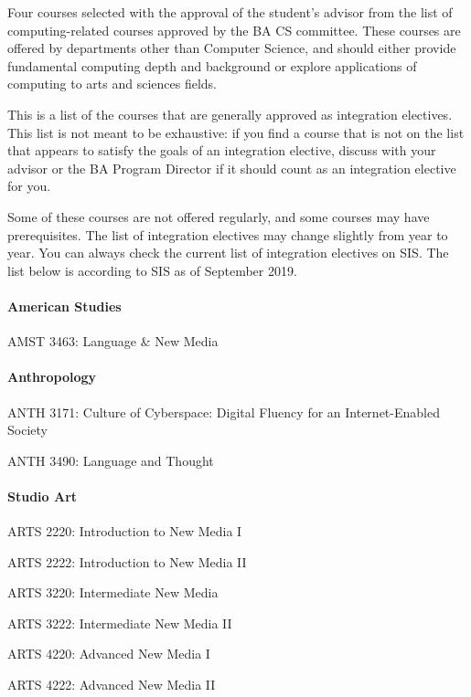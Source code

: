 Four courses selected with the approval of the student's advisor from
the list of computing-related courses approved by the BA CS
committee. These courses are offered by departments other than
Computer Science, and should either provide fundamental computing
depth and background or explore applications of computing to arts and
sciences fields. 

This is a list of the courses that are generally approved as
integration electives. This list is not meant to be exhaustive: if you
find a course that is not on the list that appears to satisfy the
goals of an integration elective, discuss with your advisor or the BA
Program Director if it should count as an integration elective for
you.

Some of these courses are not offered regularly, and some courses may
have prerequisites. The list of integration electives may change
slightly from year to year.  You can always check the current list of
integration electives on SIS.  The list below is according to SIS as
of September 2019.

\paragraph{American Studies}
\begin{itemlist}
\item AMST 3463: Language \& New Media
\end{itemlist}

\paragraph{Anthropology}
\begin{itemlist}
\item ANTH 3171: Culture of Cyberspace: Digital Fluency for an Internet-Enabled Society
\item ANTH 3490: Language and Thought
\end{itemlist}


\paragraph{Studio Art}
\begin{itemlist}
\item ARTS 2220: Introduction to New Media I
\item ARTS 2222: Introduction to New Media II
\item ARTS 3220: Intermediate New Media 
\item ARTS 3222: Intermediate New Media II
\item ARTS 4220: Advanced New Media I
\item ARTS 4222: Advanced New Media II
\end{itemlist}

